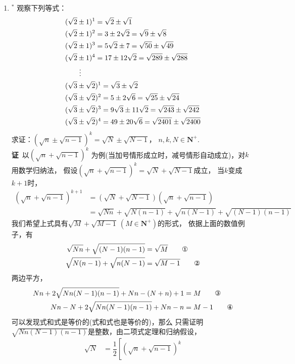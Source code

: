 \begin{enumerate}[label={【\textbf{例\thechapter.\arabic*}】},
 leftmargin=\inteval{\myenumleftmargin}pt,
 itemsep=\inteval{\myenumitempsep}pt,
 itemindent=\inteval{\myenumitemindent}pt]
\item $^*$ 观察下列等式：
\begin{align*}
    &(\sqrt{2} \pm 1)^{1}=\sqrt{2} \pm \sqrt{1} \\
    &(\sqrt{2} \pm 1)^{2}=3 \pm 2\sqrt{2}=\sqrt{9} \pm \sqrt{8} \\
    &(\sqrt{2} \pm 1)^{3}=5\sqrt{2} \pm 7=\sqrt{50} \pm \sqrt{49} \\
    &(\sqrt{2} \pm 1)^{4}=17 \pm 12\sqrt{2}=\sqrt{289} \pm \sqrt{288} \\
    & \quad\quad \vdots \\
    &(\sqrt{3} \pm \sqrt{2})^{1}=\sqrt{3} \pm \sqrt{2} \\
    &(\sqrt{3} \pm \sqrt{2})^{2}=5 \pm 2\sqrt{6}=\sqrt{25} \pm \sqrt{24} \\
    &(\sqrt{3} \pm \sqrt{2})^{3}=9\sqrt{3} \pm 11\sqrt{2}=\sqrt{243} \pm 
    \sqrt{242} \\
    &(\sqrt{3} \pm \sqrt{2})^{4}=49 \pm 20\sqrt{6}=\sqrt{2401} \pm \sqrt{2400}    
\end{align*}
求证：$ (\sqrt{n}\pm\sqrt{n-1})^k=\sqrt{N}\pm\sqrt{N-1} $，
$ n,k,N\in \textbf{N}^+ $. \\
\textbf{证}\ 以$ (\sqrt{n}+\sqrt{n-1})^{k} $
为例(当加号情形成立时，减号情形自动成立)，对$ k $用数学归纳法，
假设$ (\sqrt{n}+\sqrt{n-1})^k=\sqrt{N}+\sqrt{N-1} $成立，
当$ k $变成$ k+1 $时，
\begin{align*}
    (\sqrt{n}+\sqrt{n-1})^{k+1}&=(\sqrt{N}+\sqrt{N-1})(\sqrt{n}+\sqrt{n-1}) \\
    &=\sqrt{Nn}+\sqrt{N(n-1)}+\sqrt{n(N-1)}+\sqrt{(N-1)(n-1)}
\end{align*}
我们希望上式具有$ \sqrt{M}+\sqrt{M-1}\ (M\in \textbf{N}^+) $的形式，
依据上面的数值例子，有
\begin{align*}
    \sqrt{Nn}+\sqrt{(N-1)(n-1)} &=\sqrt{M}   \tag*{\ding{172}} \\
    \sqrt{N(n-1)}+\sqrt{n(N-1)} &=\sqrt{M-1} \tag*{\ding{173}}
\end{align*}
两边平方，
\begin{align*}
    Nn+2\sqrt{Nn(N-1)(n-1)}+Nn-(N+n)+1 &=M   \tag*{\ding{174}} \\
    Nn-N+2\sqrt{Nn(N-1)(n-1)}+Nn-n     &=M-1 \tag*{\ding{175}}
\end{align*}
可以发现式和式是等价的(式和式也是等价的)，那么
只需证明$ \sqrt{Nn(N-1)(n-1)} $是整数，由二项式定理和归纳假设，
\begin{align*}
    \sqrt{N} &=\dfrac{1}{2}\left[(\sqrt{n}+\sqrt{n-1})^k

\end{align*}
\end{enumerate}
